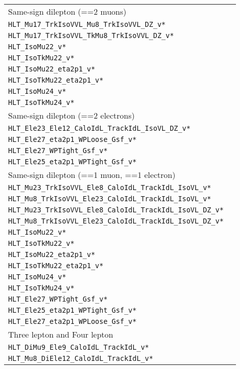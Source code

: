 \begin{table}
\centering \footnotesize
\begin{tabular}{ll}
Same-sign dilepton (==2 muons)\\
\verb|HLT_Mu17_TrkIsoVVL_Mu8_TrkIsoVVL_DZ_v*|\\
\verb|HLT_Mu17_TrkIsoVVL_TkMu8_TrkIsoVVL_DZ_v*|\\
\verb|HLT_IsoMu22_v*|\\
\verb|HLT_IsoTkMu22_v*|\\
\verb|HLT_IsoMu22_eta2p1_v*| \\
\verb|HLT_IsoTkMu22_eta2p1_v*| \\
\verb|HLT_IsoMu24_v*| \\
\verb|HLT_IsoTkMu24_v*|\\\hline
Same-sign dilepton (==2 electrons)\\
\verb|HLT_Ele23_Ele12_CaloIdL_TrackIdL_IsoVL_DZ_v*|\\
\verb|HLT_Ele27_eta2p1_WPLoose_Gsf_v*|\\
\verb|HLT_Ele27_WPTight_Gsf_v*| \\
\verb|HLT_Ele25_eta2p1_WPTight_Gsf_v*| \\\hline
Same-sign dilepton (==1 muon, ==1 electron)\\
\verb|HLT_Mu23_TrkIsoVVL_Ele8_CaloIdL_TrackIdL_IsoVL_v*|\\
\verb|HLT_Mu8_TrkIsoVVL_Ele23_CaloIdL_TrackIdL_IsoVL_v*|\\
\verb|HLT_Mu23_TrkIsoVVL_Ele8_CaloIdL_TrackIdL_IsoVL_DZ_v*| \\
\verb|HLT_Mu8_TrkIsoVVL_Ele23_CaloIdL_TrackIdL_IsoVL_DZ_v*| \\
\verb|HLT_IsoMu22_v*|\\
\verb|HLT_IsoTkMu22_v*|\\
\verb|HLT_IsoMu22_eta2p1_v*| \\
\verb|HLT_IsoTkMu22_eta2p1_v*| \\
\verb|HLT_IsoMu24_v*| \\
\verb|HLT_IsoTkMu24_v*| \\
\verb|HLT_Ele27_WPTight_Gsf_v*| \\
\verb|HLT_Ele25_eta2p1_WPTight_Gsf_v*| \\
\verb|HLT_Ele27_eta2p1_WPLoose_Gsf_v*|\\\hline
Three lepton and Four lepton\\
\verb|HLT_DiMu9_Ele9_CaloIdL_TrackIdL_v*|\\
\verb|HLT_Mu8_DiEle12_CaloIdL_TrackIdL_v*|\\

\end{tabular}
\end{table}
